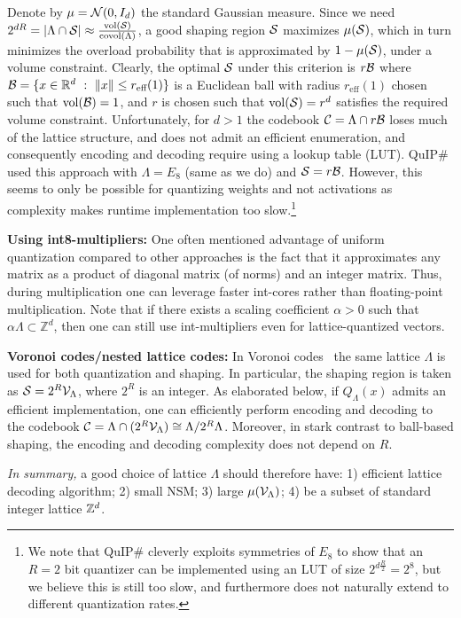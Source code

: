Denote by $\mu=\mathcal{N}(0,I_d)$ the standard Gaussian measure. Since we need $2^{dR}=|\Lambda\cap \mathcal{S}|\approx \frac{\mathrm{vol}(\mathcal{S})}{\mathrm{covol}(\Lambda)}$, a good shaping region $\mathcal{S}$ maximizes $\mu(\mathcal{S})$, which in turn minimizes the overload probability that is approximated by $1-\mu(\mathcal{S})$, under a volume constraint. Clearly, the optimal $\mathcal{S}$ under this criterion is $r\mathcal{B}$ where $\mathcal{B}=\{x\in\mathbb{R}^d~:~\|x\|\leq r_{\text{eff}}(1)\}$ is a Euclidean ball with radius $r_{\text{eff}}(1)$ chosen such that $\mathrm{vol}(\mathcal{B})=1$, and $r$ is chosen such that $\mathrm{vol}(\mathcal{S})=r^d$ satisfies the required volume constraint. Unfortunately, for $d>1$ the codebook $\mathcal{C}=\Lambda\cap r\mathcal{B}$ loses much of the lattice structure, and does not admit an efficient enumeration, and consequently encoding and decoding require using a lookup table (LUT). QuIP\# used this approach with $\Lambda = E_8$ (same as we do) and $\mathcal{S} = r\mathcal{B}$. However, this seems to only be possible for quantizing weights and not activations as complexity makes runtime implementation too slow.\footnote{We note that QuIP\# cleverly exploits symmetries of $E_8$ to show that an $R=2$ bit quantizer can be implemented using an LUT of size $2^{d\frac{R}{2}}=2^8$, but we believe this is still too slow, and furthermore does not naturally extend to different quantization rates.}

\textbf{Using int8-multipliers:} One often mentioned advantage of uniform quantization compared to other approaches is the fact that it approximates any matrix as a product of diagonal matrix (of norms) and an integer matrix. Thus, during multiplication one can leverage faster int-cores rather than floating-point multiplication. Note that if there exists a  scaling coefficient $\alpha>0$ such that $\alpha \Lambda \subset \mathbb{Z}^d$, then one can still use int-multipliers even for lattice-quantized vectors.

\textbf{Voronoi codes/nested lattice codes:} In Voronoi codes~\cite{ConwaySloane83} the same lattice $\Lambda$ is used for both quantization and shaping. In particular, the shaping region is taken as $\mathcal{S}=2^{R} \mathcal{V}_{\Lambda}$, where $2^R$ is an integer. As elaborated below, if $Q_{\Lambda}(x)$ admits an efficient implementation, one can efficiently perform encoding and decoding to the codebook $\mathcal{C}=\Lambda\cap (2^R \mathcal{V}_{\Lambda})\cong \Lambda/2^R\Lambda$. Moreover, in stark contrast to ball-based shaping, the encoding and decoding complexity does not depend on $R$.

\textit{In summary,} a good choice of lattice $\Lambda$ should therefore have: 1) efficient lattice decoding algorithm; 2) small NSM; 3) large $\mu(\mathcal{V}_{\Lambda})$; 4) be a subset of standard integer lattice $\mathbb{Z}^d$.


